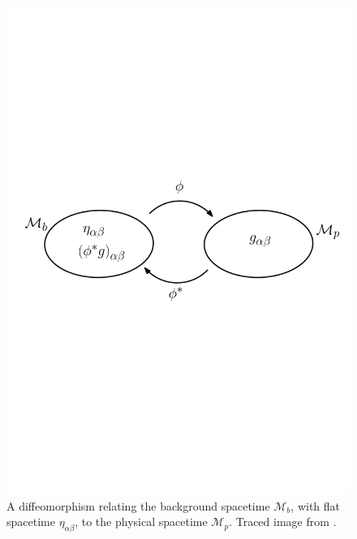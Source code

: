 \begin{figure}[h]
\begin{centering}
\includegraphics[scale=0.5]{Kap3/diffeof.pdf}\caption{A diffeomorphism relating the background spacetime $\mathcal{M}_{b}$,
with flat spacetime $\eta_{\alpha\beta}$, to the physical spacetime
$\mathcal{M}_{p}$. Traced image from \cite{CARROLL}. \label{fig:diff}}
\par\end{centering}
\end{figure}

